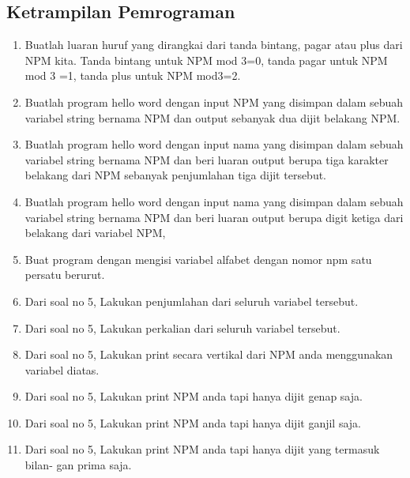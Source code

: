 \subsection{Ketrampilan Pemrograman}
\begin{enumerate}
\item Buatlah luaran huruf yang dirangkai dari tanda bintang, pagar atau plus dari
NPM kita. Tanda bintang untuk NPM mod 3=0, tanda pagar untuk NPM mod
3 =1, tanda plus untuk NPM mod3=2.


\item Buatlah program hello word dengan input NPM yang disimpan dalam sebuah
variabel string bernama NPM dan output sebanyak dua dijit belakang NPM.

\item Buatlah program hello word dengan input nama yang disimpan dalam sebuah
variabel string bernama NPM dan beri luaran output berupa tiga karakter
belakang dari NPM sebanyak penjumlahan tiga dijit tersebut.


\item Buatlah program hello word dengan input nama yang disimpan dalam sebuah
variabel string bernama NPM dan beri luaran output berupa digit ketiga dari
belakang dari variabel NPM,


\item Buat program dengan mengisi variabel alfabet
dengan nomor npm satu persatu berurut.


\item Dari soal no 5, Lakukan penjumlahan dari seluruh variabel tersebut.


\item Dari soal no 5, Lakukan perkalian dari seluruh variabel tersebut.


\item Dari soal no 5, Lakukan print secara vertikal dari NPM anda menggunakan
variabel diatas.


\item Dari soal no 5, Lakukan print NPM anda tapi hanya dijit genap saja.


\item Dari soal no 5, Lakukan print NPM anda tapi hanya dijit ganjil saja.


\item Dari soal no 5, Lakukan print NPM anda tapi hanya dijit yang termasuk bilan-
gan prima saja.


\end{enumerate}
